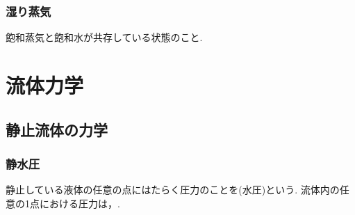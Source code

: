 \documentclass[a4paper]{jsarticle}
\begin{document}
\subsubsection{湿り蒸気}
飽和蒸気と飽和水が共存している状態のこと.
\newpage
\section{流体力学}
\subsection{静止流体の力学}
\subsubsection{静水圧}
静止している液体の任意の点にはたらく圧力のことを(水圧)という.
流体内の任意の1点における圧力は，.
\end{document}
